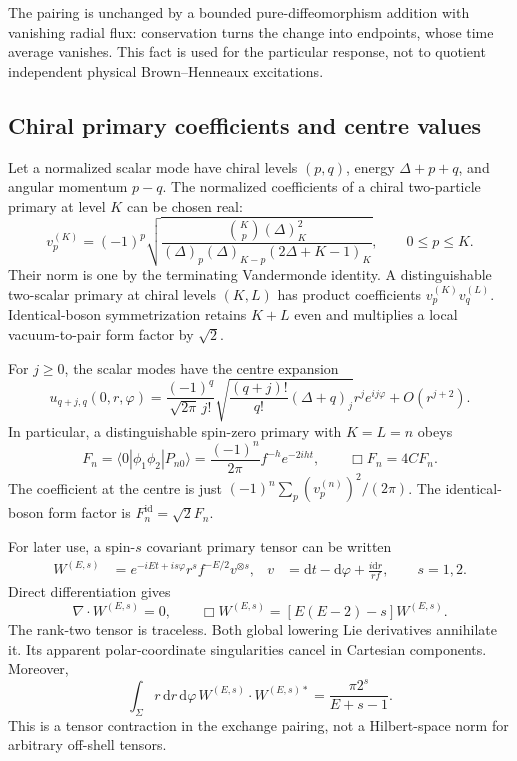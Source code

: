 \documentclass[11pt,a4paper]{article}
\numberwithin{equation}{section}
\theoremstyle{remark}\newtheorem{remark}[theorem]{Remark}
\newcommand{\dd}{\mathrm d}
\newcommand{\ket}[1]{|#1\rangle}
\newcommand{\bra}[1]{\langle#1|}
\begin{document}
The pairing is unchanged by a bounded pure-diffeomorphism addition with vanishing radial flux: conservation turns the change into endpoints, whose time average vanishes. This fact is used for the particular response, not to quotient independent physical Brown--Henneaux excitations.

\subsection{Chiral primary coefficients and centre values}

Let a normalized scalar mode have chiral levels $(p,q)$, energy $\Delta+p+q$, and angular momentum $p-q$. The normalized coefficients of a chiral two-particle primary at level $K$ can be chosen real:
\begin{equation}
 v_p^{(K)}=(-1)^p
 \sqrt{\frac{\binom Kp(\Delta)_K^2}
 {(\Delta)_p(\Delta)_{K-p}(2\Delta+K-1)_K}},\qquad 0\leq p\leq K.
 \label{eq:CG}
\end{equation}
Their norm is one by the terminating Vandermonde identity. A distinguishable two-scalar primary at chiral levels $(K,L)$ has product coefficients $v_p^{(K)}v_q^{(L)}$. Identical-boson symmetrization retains $K+L$ even and multiplies a local vacuum-to-pair form factor by $\sqrt2$.

For $j\geq0$, the scalar modes have the centre expansion
\begin{equation}
 u_{q+j,q}(0,r,\varphi)=
 \frac{(-1)^q}{\sqrt{2\pi}\,j!}
 \sqrt{\frac{(q+j)!}{q!}(\Delta+q)_j}
 r^je^{ij\varphi}+O(r^{j+2}).
 \label{eq:centremode}
\end{equation}
In particular, a distinguishable spin-zero primary with $K=L=n$ obeys
\begin{equation}
 F_n=\bra0\phi_1\phi_2\ket{P_{n0}}
 =\frac{(-1)^n}{2\pi}f^{-h}e^{-2iht},\qquad
 \Box F_n=4C F_n.
 \label{eq:F}
\end{equation}
The coefficient at the centre is just $(-1)^n\sum_p(v_p^{(n)})^2/(2\pi)$. The identical-boson form factor is $F_n^{\mathrm{id}}=\sqrt2F_n$.

For later use, a spin-$s$ covariant primary tensor can be written
\begin{align}
 W^{(E,s)}&=e^{-iEt+is\varphi}r^sf^{-E/2}v^{\otimes s},&
 v&=\dd t-\dd\varphi+\frac{i\dd r}{rf},\qquad s=1,2.\label{eq:W}
\end{align}
Direct differentiation gives
\begin{equation}
 \nabla\cdot W^{(E,s)}=0,\qquad
 \Box W^{(E,s)}=[E(E-2)-s]W^{(E,s)}.
 \label{eq:Weigen}
\end{equation}
The rank-two tensor is traceless. Both global lowering Lie derivatives annihilate it. Its apparent polar-coordinate singularities cancel in Cartesian components. Moreover,
\begin{equation}
 \int_\Sigma r\,\dd r\,\dd\varphi\,
 W^{(E,s)}\cdot W^{(E,s)*}
 =\frac{\pi 2^s}{E+s-1}.
 \label{eq:Wnorm}
\end{equation}
This is a tensor contraction in the exchange pairing, not a Hilbert-space norm for arbitrary off-shell tensors.
\end{document}
